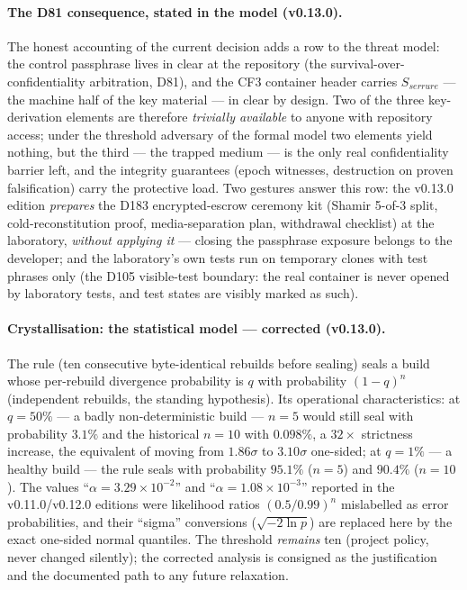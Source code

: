 \documentclass[11pt,a4paper]{article}
\begin{document}
\paragraph{The D81 consequence, stated in the model (v0.13.0).} The
honest accounting of the current decision adds a row to the threat
model: the control passphrase lives in clear at the repository (the
survival-over-confidentiality arbitration, D81), and the CF3 container
header carries $S_{serrure}$ --- the machine half of the key material ---
in clear by design. Two of the three key-derivation elements are
therefore \emph{trivially available} to anyone with repository access;
under the threshold adversary of the formal model two elements yield
nothing, but the third --- the trapped medium --- is the only real
confidentiality barrier left, and the integrity guarantees (epoch
witnesses, destruction on proven falsification) carry the protective
load. Two gestures answer this row: the v0.13.0 edition \emph{prepares}
the D183 encrypted-escrow ceremony kit (Shamir 5-of-3 split,
cold-reconstitution proof, media-separation plan, withdrawal checklist)
at the laboratory, \emph{without applying it} --- closing the passphrase
exposure belongs to the developer; and the laboratory's own tests run on
temporary clones with test phrases only (the D105 visible-test boundary:
the real container is never opened by laboratory tests, and test states
are visibly marked as such).

\paragraph{Crystallisation: the statistical model --- corrected (v0.13.0).}
The rule (ten consecutive byte-identical rebuilds before sealing) seals
a build whose per-rebuild divergence probability is $q$ with probability
$(1-q)^n$ (independent rebuilds, the standing hypothesis). Its
operational characteristics: at $q = 50\%$ --- a badly
non-deterministic build --- $n = 5$ would still seal with probability
$3.1\%$ and the historical $n = 10$ with $0.098\%$, a $32\times$
strictness increase, the equivalent of moving from $1.86\sigma$ to
$3.10\sigma$ one-sided; at $q = 1\%$ --- a healthy build --- the rule
seals with probability $95.1\%$ ($n{=}5$) and $90.4\%$ ($n{=}10$). The
values ``$\alpha = 3.29\times10^{-2}$'' and ``$\alpha = 1.08\times
10^{-3}$'' reported in the v0.11.0/v0.12.0 editions were likelihood
ratios $(0.5/0.99)^n$ mislabelled as error probabilities, and their
``sigma'' conversions ($\sqrt{-2\ln p}$) are replaced here by the exact
one-sided normal quantiles. The threshold \emph{remains} ten (project
policy, never changed silently); the corrected analysis is consigned as
the justification and the documented path to any future relaxation.
\end{document}
